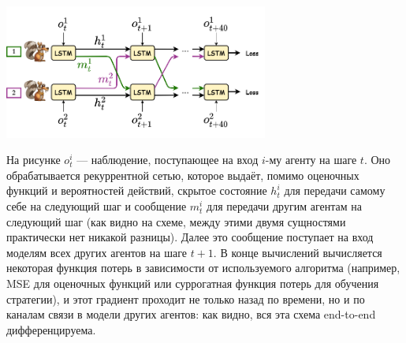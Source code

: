 \begin{center}
    \includegraphics[width=0.65\textwidth]{Images/Communication.png}
\end{center}

На рисунке $o_t^i$ --- наблюдение, поступающее на вход $i$-му агенту на шаге $t$. Оно обрабатывается рекуррентной сетью, которое выдаёт, помимо оценочных функций и вероятностей действий, скрытое состояние $h^i_{t}$ для передачи самому себе на следующий шаг и сообщение $m^i_t$ для передачи другим агентам на следующий шаг (как видно на схеме, между этими двумя сущностями практически нет никакой разницы). Далее это сообщение поступает на вход моделям всех других агентов на шаге $t + 1$. В конце вычислений вычисляется некоторая функция потерь в зависимости от используемого алгоритма (например, MSE для оценочных функций или суррогатная функция потерь для обучения стратегии), и этот градиент проходит не только назад по времени, но и по каналам связи в модели других агентов: как видно, вся эта схема end-to-end дифференцируема.
